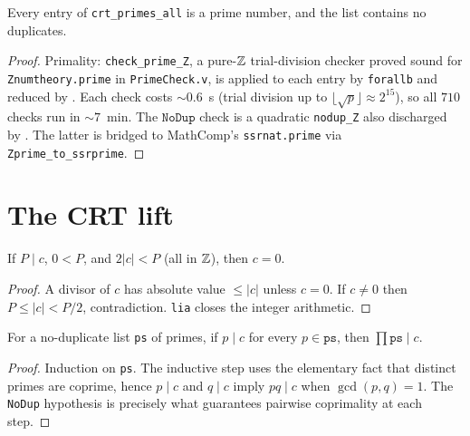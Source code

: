 \begin{lemma}\label{lem:crt_primes_all_prime}
\rocqok
{}
Every entry of \texttt{crt\_primes\_all} is a prime number, and the
list contains no duplicates.
\end{lemma}
\begin{proof}\rocqok
Primality: \texttt{check\_prime\_Z}, a pure-$\mathbb{Z}$ trial-division checker
proved sound for \texttt{Znumtheory.prime} in \texttt{PrimeCheck.v}, is
applied to each entry by \texttt{forallb} and reduced by \vmcompute.
Each check costs ${\sim}0.6$~s (trial division up to
$\lfloor\sqrt{p}\rfloor \approx 2^{15}$), so all $710$ checks run in
${\sim}7$~min. The $\texttt{NoDup}$ check is a quadratic
\texttt{nodup\_Z} also discharged by \vmcompute. The latter is bridged
to MathComp's \texttt{ssrnat.prime} via
\texttt{Zprime\_to\_ssrprime}.
\end{proof}

\section{The CRT lift}

\begin{lemma}\label{lem:small_multiple_zero}
\rocqok
If $P \mid c$, $0 < P$, and $2|c| < P$ (all in $\mathbb{Z}$), then $c = 0$.
\end{lemma}
\begin{proof}\rocqok
A divisor of $c$ has absolute value $\le |c|$ unless $c = 0$. If
$c \ne 0$ then $P \le |c| < P/2$, contradiction. \texttt{lia} closes
the integer arithmetic.
\end{proof}

\begin{lemma}\label{lem:all_primes_divide}
\rocqok
For a no-duplicate list \texttt{ps} of primes, if $p \mid c$ for every
$p \in \texttt{ps}$, then $\prod\texttt{ps} \mid c$.
\end{lemma}
\begin{proof}\rocqok
Induction on \texttt{ps}. The inductive step uses the elementary fact
that distinct primes are coprime, hence $p \mid c$ and $q \mid c$
imply $pq \mid c$ when $\gcd(p, q) = 1$. The \texttt{NoDup} hypothesis
is precisely what guarantees pairwise coprimality at each step.
\end{proof}

